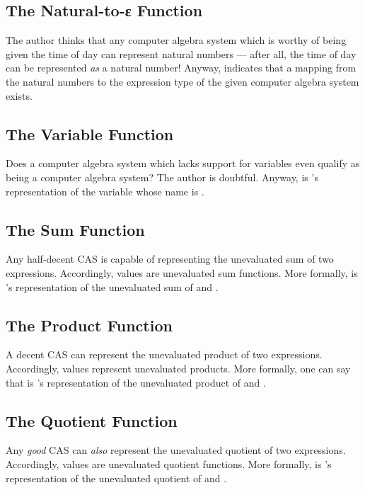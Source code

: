 \documentclass{report}
\begin{document}
\subsection{The Natural-to-ε Function}
The author thinks that any computer algebra system which is worthy of being given the time of day can represent natural numbers --- after all, the time of day can be represented \emph{as} a natural number!  Anyway,  indicates that a mapping from the natural numbers to the expression type of the given computer algebra system exists.

\subsection{The Variable Function}
Does a computer algebra system which lacks support for variables even qualify as being a computer algebra system?  The author is doubtful.  Anyway,    is 's representation of the variable whose name is .

\subsection{The Sum Function}
Any half-decent CAS is capable of representing the unevaluated sum of two expressions.  Accordingly,  values are unevaluated sum functions.  More formally,     is 's representation of the unevaluated sum of  and .

\subsection{The Product Function}
A decent CAS can represent the unevaluated product of two expressions.  Accordingly,  values represent unevaluated products.  More formally, one can say that     is 's representation of the unevaluated product of  and .

\subsection{The Quotient Function}
Any \emph{good} CAS can \emph{also} represent the unevaluated quotient of two expressions.  Accordingly,  values are unevaluated quotient functions.  More formally,     is 's representation of the unevaluated quotient of  and .
\end{document}
